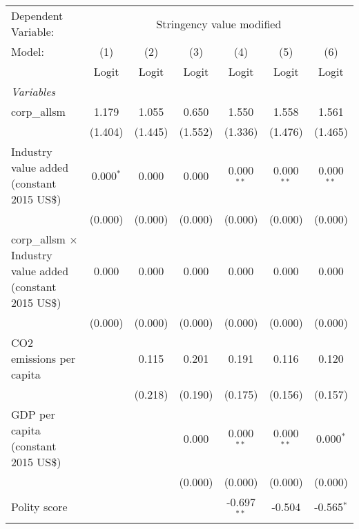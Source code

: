 
\begingroup
\centering
\begin{tabular}{lcccccc}
   \toprule
   Dependent Variable: & \multicolumn{6}{c}{Stringency value modified}\\
   Model:                                                            & (1)         & (2)     & (3)     & (4)           & (5)          & (6)\\  
                                                                     &  Logit      & Logit   & Logit   & Logit         & Logit        & Logit\\  
   \midrule
   \emph{Variables}\\
   corp\_allsm                                                       & 1.179       & 1.055   & 0.650   & 1.550         & 1.558        & 1.561\\   
                                                                     & (1.404)     & (1.445) & (1.552) & (1.336)       & (1.476)      & (1.465)\\   
   Industry value added (constant 2015 US\$)                         & 0.000$^{*}$ & 0.000   & 0.000   & 0.000$^{**}$  & 0.000$^{**}$ & 0.000$^{**}$\\   
                                                                     & (0.000)     & (0.000) & (0.000) & (0.000)       & (0.000)      & (0.000)\\   
   corp\_allsm $\times$ Industry value added (constant 2015 US\$)    & 0.000       & 0.000   & 0.000   & 0.000         & 0.000        & 0.000\\   
                                                                     & (0.000)     & (0.000) & (0.000) & (0.000)       & (0.000)      & (0.000)\\   
   CO2 emissions per capita                                          &             & 0.115   & 0.201   & 0.191         & 0.116        & 0.120\\   
                                                                     &             & (0.218) & (0.190) & (0.175)       & (0.156)      & (0.157)\\   
   GDP per capita (constant 2015 US\$)                               &             &         & 0.000   & 0.000$^{**}$  & 0.000$^{**}$ & 0.000$^{*}$\\   
                                                                     &             &         & (0.000) & (0.000)       & (0.000)      & (0.000)\\   
   Polity score                                                      &             &         &         & -0.697$^{**}$ & -0.504       & -0.565$^{*}$\\   

\end{tabular}
